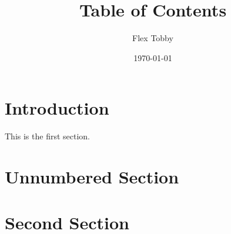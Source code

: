 \documentclass{article}
\title{Table of Contents}
\author{Flex Tobby}
\date{\today}
\begin{document}
	\maketitle
	\tableofcontents
	\section{Introduction}
	
	This is the first section.
	
	\blindtext
	
	\section*{Unnumbered Section}
	
	\blindtext
	
	\section{Second Section}
	
	\blindtext
	
\end{document}
